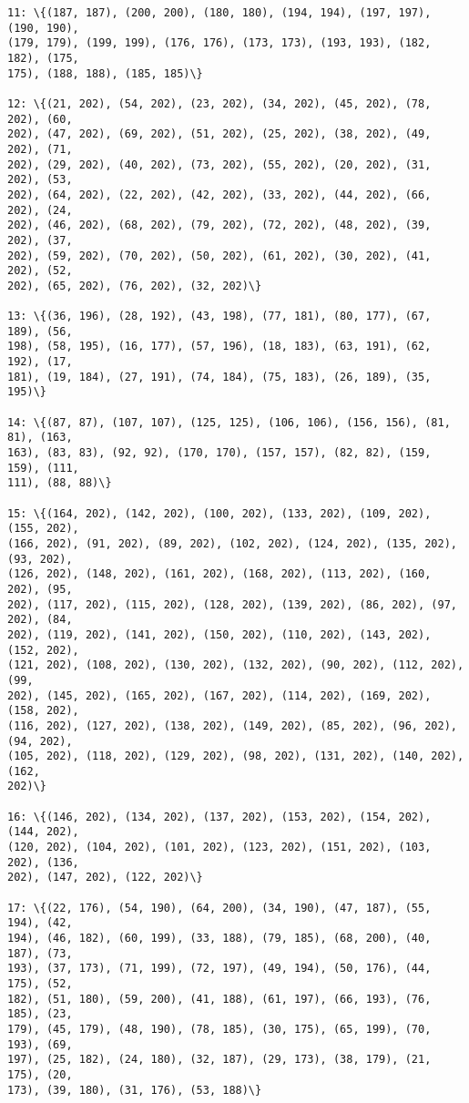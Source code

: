 \documentclass[11pt]{article}
\begin{document}
\begin{Verbatim}[commandchars=\\\{\}]
11: \{(187, 187), (200, 200), (180, 180), (194, 194), (197, 197), (190, 190),
(179, 179), (199, 199), (176, 176), (173, 173), (193, 193), (182, 182), (175,
175), (188, 188), (185, 185)\}

12: \{(21, 202), (54, 202), (23, 202), (34, 202), (45, 202), (78, 202), (60,
202), (47, 202), (69, 202), (51, 202), (25, 202), (38, 202), (49, 202), (71,
202), (29, 202), (40, 202), (73, 202), (55, 202), (20, 202), (31, 202), (53,
202), (64, 202), (22, 202), (42, 202), (33, 202), (44, 202), (66, 202), (24,
202), (46, 202), (68, 202), (79, 202), (72, 202), (48, 202), (39, 202), (37,
202), (59, 202), (70, 202), (50, 202), (61, 202), (30, 202), (41, 202), (52,
202), (65, 202), (76, 202), (32, 202)\}

13: \{(36, 196), (28, 192), (43, 198), (77, 181), (80, 177), (67, 189), (56,
198), (58, 195), (16, 177), (57, 196), (18, 183), (63, 191), (62, 192), (17,
181), (19, 184), (27, 191), (74, 184), (75, 183), (26, 189), (35, 195)\}

14: \{(87, 87), (107, 107), (125, 125), (106, 106), (156, 156), (81, 81), (163,
163), (83, 83), (92, 92), (170, 170), (157, 157), (82, 82), (159, 159), (111,
111), (88, 88)\}

15: \{(164, 202), (142, 202), (100, 202), (133, 202), (109, 202), (155, 202),
(166, 202), (91, 202), (89, 202), (102, 202), (124, 202), (135, 202), (93, 202),
(126, 202), (148, 202), (161, 202), (168, 202), (113, 202), (160, 202), (95,
202), (117, 202), (115, 202), (128, 202), (139, 202), (86, 202), (97, 202), (84,
202), (119, 202), (141, 202), (150, 202), (110, 202), (143, 202), (152, 202),
(121, 202), (108, 202), (130, 202), (132, 202), (90, 202), (112, 202), (99,
202), (145, 202), (165, 202), (167, 202), (114, 202), (169, 202), (158, 202),
(116, 202), (127, 202), (138, 202), (149, 202), (85, 202), (96, 202), (94, 202),
(105, 202), (118, 202), (129, 202), (98, 202), (131, 202), (140, 202), (162,
202)\}

16: \{(146, 202), (134, 202), (137, 202), (153, 202), (154, 202), (144, 202),
(120, 202), (104, 202), (101, 202), (123, 202), (151, 202), (103, 202), (136,
202), (147, 202), (122, 202)\}

17: \{(22, 176), (54, 190), (64, 200), (34, 190), (47, 187), (55, 194), (42,
194), (46, 182), (60, 199), (33, 188), (79, 185), (68, 200), (40, 187), (73,
193), (37, 173), (71, 199), (72, 197), (49, 194), (50, 176), (44, 175), (52,
182), (51, 180), (59, 200), (41, 188), (61, 197), (66, 193), (76, 185), (23,
179), (45, 179), (48, 190), (78, 185), (30, 175), (65, 199), (70, 193), (69,
197), (25, 182), (24, 180), (32, 187), (29, 173), (38, 179), (21, 175), (20,
173), (39, 180), (31, 176), (53, 188)\}


\end{Verbatim}
\end{document}
